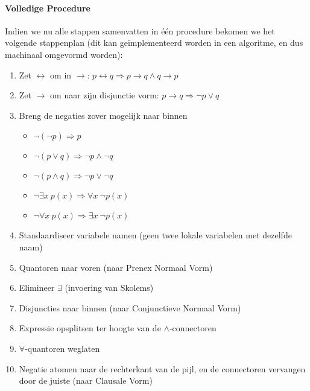 \paragraph{Volledige Procedure} Indien we nu alle stappen samenvatten in \'e\'en procedure bekomen we het volgende stappenplan (dit kan ge\"implementeerd worden in een algoritme, en dus machinaal omgevormd worden):
\begin{enumerate}
 \item Zet $\leftrightarrow$ om in $\rightarrow$: $p\leftrightarrow q\Rightarrow p\rightarrow q\wedge q\rightarrow p$
 \item Zet $\rightarrow$ om naar zijn disjunctie vorm: $p\rightarrow q\Rightarrow \neg p\vee q$
 \item Breng de negaties zover mogelijk naar binnen
\begin{itemize}
 \item $\neg\left(\neg p\right)\Rightarrow p$
 \item $\neg\left(p\vee q\right)\Rightarrow \neg p\wedge\neg q$
 \item $\neg\left(p\wedge q\right)\Rightarrow \neg p\vee\neg q$
 \item $\neg\exists x\ p\left(x\right)\Rightarrow \forall x\ \neg p\left(x\right)$
 \item $\neg\forall x\ p\left(x\right)\Rightarrow \exists x\ \neg p\left(x\right)$
\end{itemize}
 \item Standaardiseer variabele namen (geen twee lokale variabelen met dezelfde naam)
 \item Quantoren naar voren (naar Prenex Normaal Vorm)
 \item Elimineer $\exists$ (invoering van Skolems)
 \item Disjuncties naar binnen (naar Conjunctieve Normaal Vorm)
 \item Expressie opsplitsen ter hoogte van de $\wedge$-connectoren
 \item $\forall$-quantoren weglaten
 \item Negatie atomen naar de rechterkant van de pijl, en de connectoren vervangen door de juiste (naar Clausale Vorm)
\end{enumerate}
